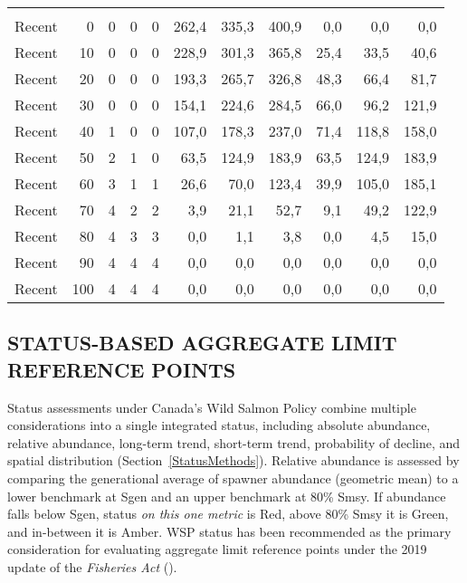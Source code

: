 \documentclass[french,11pt]{book}
\begin{document}
\begin{longtable}[t]{lrrrrrrrrrr}
\midrule\\ Recent & 0 & 0 & 0 & 0 & 262,4 & 335,3 & 400,9 & 0,0 & 0,0 & 0,0\\ Recent & 10 & 0 & 0 & 0 & 228,9 & 301,3 & 365,8 & 25,4 & 33,5 & 40,6\\ Recent & 20 & 0 & 0 & 0 & 193,3 & 265,7 & 326,8 & 48,3 & 66,4 & 81,7\\ Recent & 30 & 0 & 0 & 0 & 154,1 & 224,6 & 284,5 & 66,0 & 96,2 & 121,9\\ Recent & 40 & 1 & 0 & 0 & 107,0 & 178,3 & 237,0 & 71,4 & 118,8 & 158,0\\ Recent & 50 & 2 & 1 & 0 & 63,5 & 124,9 & 183,9 & 63,5 & 124,9 & 183,9\\ Recent & 60 & 3 & 1 & 1 & 26,6 & 70,0 & 123,4 & 39,9 & 105,0 & 185,1\\ Recent & 70 & 4 & 2 & 2 & 3,9 & 21,1 & 52,7 & 9,1 & 49,2 & 122,9\\ Recent & 80 & 4 & 3 & 3 & 0,0 & 1,1 & 3,8 & 0,0 & 4,5 & 15,0\\ Recent & 90 & 4 & 4 & 4 & 0,0 & 0,0 & 0,0 & 0,0 & 0,0 & 0,0\\ Recent & 100 & 4 & 4 & 4 & 0,0 & 0,0 & 0,0 & 0,0 & 0,0 & 0,0\\* \end{longtable}

\endgroup{} \endgroup{}

\clearpage

\subsection{STATUS-BASED AGGREGATE LIMIT REFERENCE POINTS}\label{StatusRPResults}

Status assessments under Canada's Wild Salmon Policy combine multiple considerations into a single integrated status, including absolute abundance, relative abundance, long-term trend, short-term trend, probability of decline, and spatial distribution (Section~\ref{StatusMethods}). Relative abundance is assessed by comparing the generational average of spawner abundance (geometric mean) to a lower benchmark at Sgen and an upper benchmark at 80\% Smsy. If abundance falls below Sgen, status \emph{on this one metric} is Red, above 80\% Smsy it is Green, and in-between it is Amber. WSP status has been recommended as the primary consideration for evaluating aggregate limit reference points under the 2019 update of the \emph{Fisheries Act} ().
\end{document}
